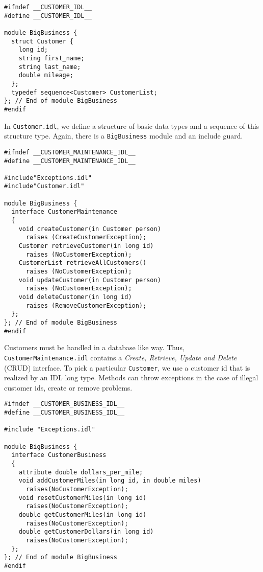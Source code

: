  
\begin{small}
\begin{verbatim}
#ifndef __CUSTOMER_IDL__
#define __CUSTOMER_IDL__

module BigBusiness {
  struct Customer {
    long id;
    string first_name;
    string last_name;
    double mileage;
  };
  typedef sequence<Customer> CustomerList;
}; // End of module BigBusiness
#endif
\end{verbatim}
\end{small}

In {\tt Customer.idl}, we define a structure of basic data types and a sequence 
of this structure type.
Again, there is a {\tt BigBusiness} module and an include guard.

\begin{small}
\begin{verbatim}
#ifndef __CUSTOMER_MAINTENANCE_IDL__
#define __CUSTOMER_MAINTENANCE_IDL__

#include"Exceptions.idl"
#include"Customer.idl"

module BigBusiness {
  interface CustomerMaintenance
  {
    void createCustomer(in Customer person) 
      raises (CreateCustomerException);
    Customer retrieveCustomer(in long id)  
      raises (NoCustomerException);
    CustomerList retrieveAllCustomers()  
      raises (NoCustomerException);
    void updateCustomer(in Customer person)  
      raises (NoCustomerException);
    void deleteCustomer(in long id)  
      raises (RemoveCustomerException);
  };
}; // End of module BigBusiness
#endif
\end{verbatim}
\end{small}
Customers must be handled in a database like way. 
Thus, {\tt CustomerMaintenance.idl} contains a 
{\it Create, Retrieve, Update and Delete} (CRUD) interface. 
To pick a particular {\tt Customer}, we use a customer id that is realized by 
an IDL long type.
Methods can throw exceptions in the case of illegal customer ids, create or 
remove problems. 


\begin{small}
\begin{verbatim}
#ifndef __CUSTOMER_BUSINESS_IDL__
#define __CUSTOMER_BUSINESS_IDL__

#include "Exceptions.idl"

module BigBusiness {
  interface CustomerBusiness
  {
    attribute double dollars_per_mile;
    void addCustomerMiles(in long id, in double miles) 
      raises(NoCustomerException);
    void resetCustomerMiles(in long id) 
      raises(NoCustomerException);
    double getCustomerMiles(in long id) 
      raises(NoCustomerException);
    double getCustomerDollars(in long id) 
      raises(NoCustomerException);
  };
}; // End of module BigBusiness
#endif
\end{verbatim}
\end{small}


